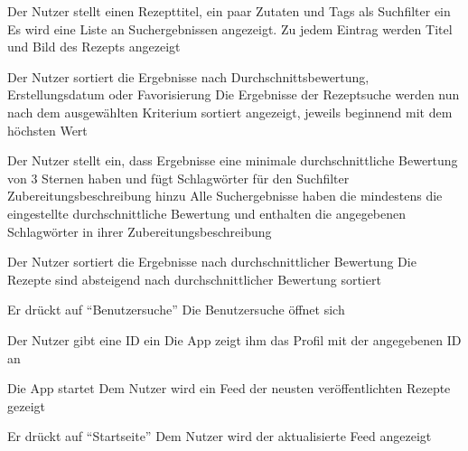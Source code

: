 {Der Nutzer stellt einen Rezepttitel, ein paar Zutaten und Tags als Suchfilter ein}
{Es wird eine Liste an Suchergebnissen angezeigt. Zu jedem Eintrag werden Titel und Bild des Rezepts angezeigt}

{Der Nutzer sortiert die Ergebnisse nach Durchschnittsbewertung, Erstellungsdatum oder Favorisierung}
{Die Ergebnisse der Rezeptsuche werden nun nach dem ausgewählten Kriterium sortiert angezeigt, jeweils beginnend mit dem höchsten Wert}


{Der Nutzer stellt ein, dass Ergebnisse eine minimale durchschnittliche Bewertung von 3 Sternen haben und fügt Schlagwörter für den Suchfilter Zubereitungsbeschreibung hinzu}
{Alle Suchergebnisse haben die mindestens die eingestellte durchschnittliche Bewertung und enthalten die angegebenen Schlagwörter in ihrer Zubereitungsbeschreibung}

{Der Nutzer sortiert die Ergebnisse nach durchschnittlicher Bewertung}
{Die Rezepte sind absteigend nach durchschnittlicher Bewertung sortiert}


{Er drückt auf "`Benutzersuche"'}
{Die Benutzersuche öffnet sich}

{Der Nutzer gibt eine ID ein}
{Die App zeigt ihm das Profil mit der angegebenen ID an}



{Die App startet}
{Dem Nutzer wird ein \gls{Feed} der neusten veröffentlichten Rezepte gezeigt}

{Er drückt auf "`Startseite"'}
{Dem Nutzer wird der aktualisierte Feed angezeigt}
